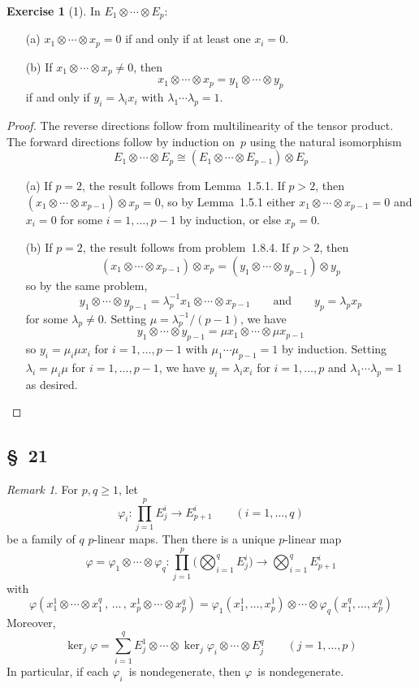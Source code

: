 \documentclass[letterpaper,12pt]{article}
\newcommand{\iso}{\cong}
\newcommand{\tprod}{\otimes}
\newcommand{\bigtprod}{\bigotimes}
\newcommand{\multi}[4]{#2_{#3}#1\cdots#1#2_{#4}}
\newcommand{\tprods}[3]{\multi{\tprod}{#1}{#2}{#3}}
\theoremstyle{definition}
\newtheorem*{exer}{Exercise}
\theoremstyle{remark}
\newtheorem*{rmk}{Remark}
\begin{document}
\begin{exer}[1]
In \(\tprods{E}{1}{p}\):
\begin{enumerate}
\item[(a)] \(\tprods{x}{1}{p}=0\) if and only if at least one \(x_i=0\).
\item[(b)] If \(\tprods{x}{1}{p}\ne 0\), then
\[\tprods{x}{1}{p}=\tprods{y}{1}{p}\]
if and only if \(y_i=\lambda_i x_i\) with \(\lambda_1\cdots\lambda_p=1\).
\end{enumerate}
\end{exer}
\begin{proof}
The reverse directions follow from multilinearity of the tensor product. The forward directions follow by induction on~\(p\) using the natural isomorphism
\[\tprods{E}{1}{p}\iso(\tprods{E}{1}{p-1})\tprod E_p\]
\begin{enumerate}
\item[(a)] If \(p=2\), the result follows from Lemma~1.5.1. If \(p>2\), then \((\tprods{x}{1}{p-1})\tprod x_p=0\), so by Lemma~1.5.1 either \(\tprods{x}{1}{p-1}=0\) and \(x_i=0\) for some \(i=1,\ldots,p-1\) by induction, or else \(x_p=0\).
\item[(b)] If \(p=2\), the result follows from problem~1.8.4. If \(p>2\), then
\[(\tprods{x}{1}{p-1})\tprod x_p=(\tprods{y}{1}{p-1})\tprod y_p\]
so by the same problem,
\[\tprods{y}{1}{p-1}=\lambda_p^{-1}\tprods{x}{1}{p-1}\qquad\text{and}\qquad y_p=\lambda_p x_p\]
for some \(\lambda_p\ne 0\). Setting \(\mu=\lambda_p^{-1}/(p-1)\), we have
\[\tprods{y}{1}{p-1}=\mu x_1\tprod\cdots\tprod\mu x_{p-1}\]
so \(y_i=\mu_i\mu x_i\) for \(i=1,\ldots,p-1\) with \(\mu_1\cdots\mu_{p-1}=1\) by induction. Setting \(\lambda_i=\mu_i\mu\) for \(i=1,\ldots,p-1\), we have \(y_i=\lambda_i x_i\) for \(i=1,\ldots,p\) and \(\lambda_1\cdots\lambda_p=1\) as desired.\qedhere
\end{enumerate}
\end{proof}

\subsection*{\S~21}
\begin{rmk}
For \(p,q\ge 1\), let
\[\varphi_i:\prod_{j=1}^p E^i_j\to E^i_{p+1}\qquad(i=1,\ldots,q)\]
be a family of \(q\) \(p\)-linear maps. Then there is a unique \(p\)-linear map
\[\varphi=\tprods{\varphi}{1}{q}:\prod_{j=1}^p\Biggl(\bigtprod_{i=1}^q E^i_j\Biggr)\to\bigtprod_{i=1}^q E^i_{p+1}\]
with
\[\varphi(x^1_1\tprod\cdots\tprod x^q_1\,,\,\ldots\,,\,x^1_p\tprod\cdots\tprod x^q_p)=\varphi_1(x^1_1,\ldots,x^1_p)\tprod\cdots\tprod\varphi_q(x^q_1,\ldots,x^q_p)\]
Moreover,
\[\ker_j\varphi=\sum_{i=1}^q E^1_j\tprod\cdots\tprod\ker_j\varphi_i\tprod\cdots\tprod E^q_j\qquad(j=1,\ldots,p)\]
In particular, if each \(\varphi_i\)~is nondegenerate, then \(\varphi\)~is nondegenerate.
\end{rmk}
\end{document}
